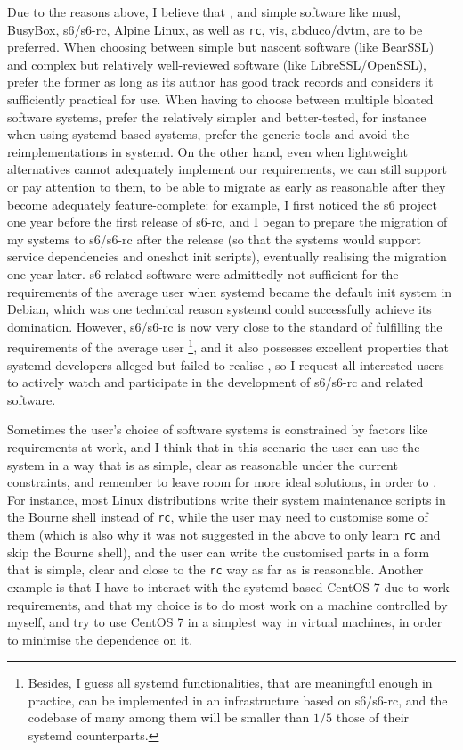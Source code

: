 Due to the reasons above, I believe that ,
and simple software like musl, BusyBox, s6/s6-rc, Alpine Linux, as well as
\verb|rc|, vis, abduco/dvtm, are to be preferred.  When choosing between simple
but nascent software (like BearSSL) and complex but relatively well-reviewed
software (like LibreSSL/OpenSSL), prefer the former as long as its author has
good track records and considers it sufficiently practical for use.  When having
to choose between multiple bloated software systems, prefer the relatively simpler
and better-tested, for instance when using systemd-based systems, prefer the
generic tools and avoid the reimplementations in systemd.  On the other hand,
even when lightweight alternatives cannot adequately implement our requirements,
we can still support or pay attention to them, to be able to migrate as early as
reasonable after they become adequately feature-complete: for example, I first
noticed the s6 project one year before the first release of s6-rc, and I began
to prepare the migration of my systems to s6/s6-rc after the release (so that
the systems would support service dependencies and oneshot init scripts),
eventually realising the migration one year later.  s6-related software were
admittedly not sufficient for the requirements of the average user when systemd
became the default init system in Debian, which was one technical reason systemd
could successfully achieve its domination.  However, s6/s6-rc is now very
close to the standard of fulfilling the requirements of the average user%
\footnote{Besides, I guess all systemd
functionalities, that are meaningful enough in practice, can be implemented in
an infrastructure based on s6/s6-rc, and the codebase of many among them will be
smaller than $1/5$ those of their systemd counterparts.}, and it also possesses
excellent properties that systemd developers alleged but failed to realise%
, so I request all interested users to actively
watch and participate in the development of s6/s6-rc and related software.

Sometimes the user's choice of software systems is constrained by factors like
requirements at work, and I think that in this scenario the user can use the
system in a way that is as simple, clear as reasonable under the current
constraints, and remember to leave room for more ideal solutions, in order to
.  For instance,
most Linux distributions write their system maintenance scripts in the Bourne
shell instead of \verb|rc|, while the user may need to customise some of them
(which is also why it was not suggested in the above to only learn \verb|rc|
and skip the Bourne shell), and the user can write the customised parts in
a form that is simple, clear and close to the \verb|rc| way as far as is
reasonable.  Another example is that I have to interact with the systemd-based
CentOS 7 due to work requirements, and that my choice is to do most work on
a machine controlled by myself, and try to use CentOS 7 in a simplest way
in virtual machines, in order to minimise the dependence on it.

